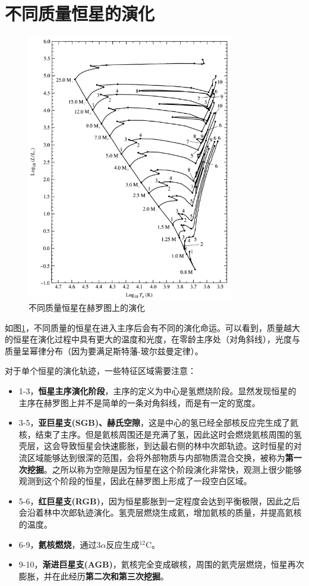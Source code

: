 \documentclass[openany]{ctexbook}
\begin{document}
\section{不同质量恒星的演化}
\begin{figure}[hbt]
  \centering
  \includegraphics[width=9cm]{chapters/13/HRD}
  \caption{不同质量恒星在赫罗图上的演化}
  \label{fig:HRDM}
\end{figure}

如图\ref{fig:HRDM}，不同质量的恒星在进入主序后会有不同的演化命运。可以看到，质量越大的恒星在演化过程中具有更大的温度和光度，在零龄主序处（对角斜线），光度与质量呈幂律分布（因为要满足斯特藩-玻尔兹曼定律）。

对于单个恒星的演化轨迹，一些特征区域需要注意：
\begin{itemize}
  \item 1-3，\textbf{恒星主序演化阶段}，主序的定义为中心是氢燃烧阶段。显然发现恒星的主序在赫罗图上并不是简单的一条对角斜线，而是有一定的宽度。
  \item 3-5，\textbf{亚巨星支(SGB)、赫氏空隙}，这是中心的氢已经全部核反应完生成了氦核，结束了主序。但是氦核周围还是充满了氢，因此这时会燃烧氦核周围的氢壳层，这会导致恒星会快速膨胀，到达最右侧的林中次郎轨迹。这时恒星的对流区域能够达到很深的范围，会将外部物质与内部物质混合交换，被称为\textbf{第一次挖掘}。之所以称为空隙是因为恒星在这个阶段演化非常快，观测上很少能够观测到这个阶段的恒星，因此在赫罗图上形成了一段空白区域。
  \item 5-6，\textbf{红巨星支(RGB)}，因为恒星膨胀到一定程度会达到平衡极限，因此之后会沿着林中次郎轨迹演化。氢壳层燃烧生成氦，增加氦核的质量，并提高氦核的温度。
  \item 6-9，\textbf{氦核燃烧}，通过3$\alpha$反应生成$^{12}$C。
  \item 9-10，\textbf{渐进巨星支(AGB)}，氦核完全变成碳核，周围的氦壳层燃烧，恒星再次膨胀，并在此经历\textbf{第二次和第三次挖掘}。
\end{itemize}
\end{document}

